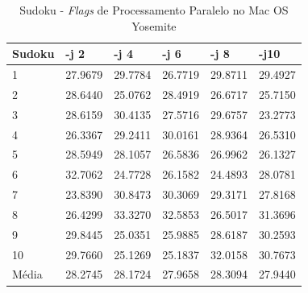 \begin{apendicesenv}
\begin{table}[!ht]
\centering
\tiny
\caption{Sudoku - \textit{Flags} de Processamento Paralelo no Mac OS Yosemite}
\label{tab:flag_processamento_paralelo:mac:sudoku}
\begin{tabular}{llllll}
\textbf{Sudoku} & \textbf{-j 2} & \textbf{-j 4} & \textbf{-j 6} & \textbf{-j 8} & \textbf{-j10}  \\ \toprule
1               & 27.9679 & 29.7784 & 26.7719 & 29.8711 & 29.4927   \\ 
2               & 28.6440 & 25.0762 & 28.4919 & 26.6717 & 25.7150   \\ 
3               & 28.6159 & 30.4135 & 27.5716 & 29.6757 & 23.2773   \\ 
4               & 26.3367 & 29.2411 & 30.0161 & 28.9364 & 26.5310   \\ 
5               & 28.5949 & 28.1057 & 26.5836 & 26.9962 & 26.1327   \\ 
6               & 32.7062 & 24.7728 & 26.1582 & 24.4893 & 28.0781   \\ 
7               & 23.8390 & 30.8473 & 30.3069 & 29.3171 & 27.8168   \\ 
8               & 26.4299 & 33.3270 & 32.5853 & 26.5017 & 31.3696   \\ 
9               & 29.8445 & 25.0351 & 25.9885 & 28.6187 & 30.2593   \\ 
10              & 29.7660 & 25.1269 & 25.1837 & 32.0158 & 30.7673   \\ \bottomrule
Média           & 28.2745 & 28.1724 & 27.9658 & 28.3094 & 27.9440   \\ 
\end{tabular}
\end{table}


\end{apendicesenv}
